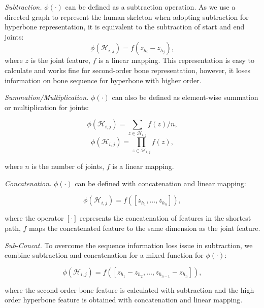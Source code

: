 \documentclass{article}
\begin{document}
\textit{Subtraction.} $\phi(\cdot)$ can be defined as a subtraction operation. As we use a directed graph to represent the human skeleton when adopting subtraction for hyperbone representation, it is equivalent to the subtraction of start and end joints:
\begin{equation}
    \phi ( \mathcal{H}_{i,j} ) = f(z_{h_i} -z_{h_j}),
\end{equation}
where $z$ is the joint feature, $f$ is a linear mapping. This representation is easy to calculate and works fine for second-order bone representation, however, it loses information on bone sequence for hyperbone with higher order.

\textit{Summation/Multiplication.} $\phi(\cdot)$ can also be defined as element-wise summation or multiplication for joints:

\begin{equation}
    \phi ( \mathcal{H}_{i,j} ) = \sum_{z\in \mathcal{H}_{i,j}}{f(z) / n},
\end{equation}
\begin{equation}
    \phi ( \mathcal{H}_{i,j} ) = \prod_{z\in \mathcal{H}_{i,j}}{f(z)},
\end{equation}

\noindent where $n$ is the number of joints, $f$ is a linear mapping.

\textit{Concatenation.} $\phi(\cdot)$ can be defined with concatenation and linear mapping:

\begin{equation}
    \phi ( \mathcal{H}_{i,j} ) = f([z_{h_1},\dots,z_{h_n}]),
\end{equation}

\noindent where the operator $[\cdot]$ represents the concatenation of features in the shortest path, $f$ maps the concatenated feature to the same dimension as the joint feature. 

\textit{Sub-Concat.} To overcome the sequence information loss issue in subtraction, we combine subtraction and concatenation for a mixed function for $\phi(\cdot)$:

\begin{equation}
    \phi ( \mathcal{H}_{i,j} ) = f([z_{h_1} - z_{h_2},\dots,z_{h_{n-1}} - z_{h_n}]),
\end{equation}

\noindent where the second-order bone feature is calculated with subtraction and the high-order hyperbone feature is obtained with concatenation and linear mapping.
\end{document}
